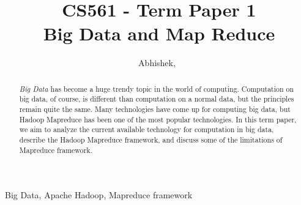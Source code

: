\documentclass[journal]{IEEEtran}
\begin{document}
%
\title{CS561 - Term Paper 1\\Big Data and Map Reduce}
%
%
%

\author{Abhishek,~}



\maketitle

\begin{abstract}
\textit{Big Data} has become a huge trendy topic in the world of computing. Computation on big data, of course, is different than computation on a normal data, but the principles remain quite the same. Many technologies have come up for computing big data, but Hadoop Mapreduce has been one of the most popular technologies. In this term paper, we aim to analyze the current available technology for computation in big data, describe the Hadoop Mapreduce framework, and discuss some of the limitations of Mapreduce framework.
\end{abstract}

\begin{IEEEkeywords}
Big Data, Apache Hadoop, Mapreduce framework
\end{IEEEkeywords}


%
\IEEEpeerreviewmaketitle
\end{document}
